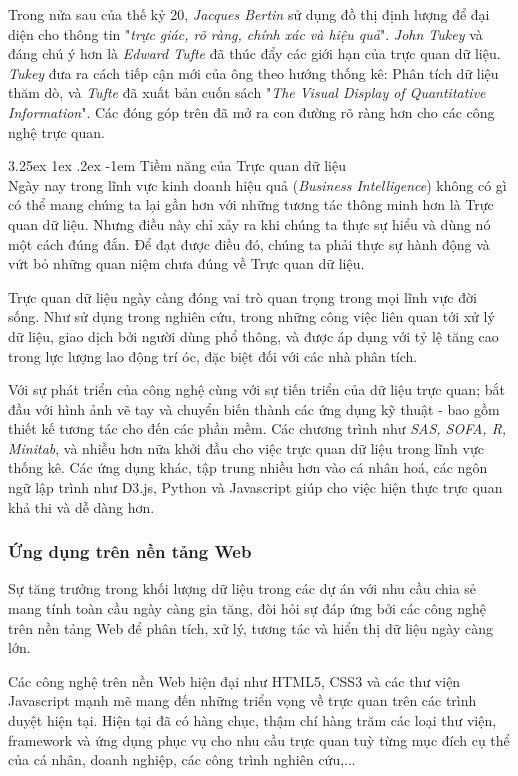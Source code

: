\documentclass[12pt,a4paper,twoside]{article}
\makeatletter
\newcommand{\myparagraph}[1]{\paragraph{#1}\mbox{}\\} %
\renewcommand\paragraph{\@startsection{paragraph}{5}{\z@}%
  {3.25ex \@plus1ex \@minus.2ex}%
  {-1em}%
  {\normalfont\normalsize\bfseries}}
\makeatother
\begin{document}
Trong nửa sau của thế kỷ 20, \textit{Jacques Bertin} sử dụng đồ thị định lượng để đại diện cho thông tin "\textit{trực giác, rõ ràng, chính xác và hiệu quả}". \cite{wiki_history_1} \textit{John Tukey} và đáng chú ý hơn là \textit{Edward Tufte} đã thúc đẩy các giới hạn của trực quan dữ liệu. \textit{Tukey} đưa ra cách tiếp cận mới của ông theo hướng thống kê: Phân tích dữ liệu thăm dò, và \textit{Tufte} đã xuất bản cuốn sách "\textit{The Visual Display of Quantitative Information}". Các đóng góp trên đã mở ra con đường rõ ràng hơn cho các công nghệ trực quan.

\myparagraph{Tiềm năng của Trực quan dữ liệu}
Ngày nay trong lĩnh vực kinh doanh hiệu quả (\textit{Business Intelligence}) không có gì có thể mang chúng ta lại gần hơn với những tương tác thông minh hơn là Trực quan dữ liệu. Nhưng điều này chỉ xảy ra khi chúng ta thực sự hiểu và dùng nó một cách đúng đắn. Để đạt được điều đó, chúng ta phải thực sự hành động và vứt bỏ những quan niệm chưa đúng về Trực quan dữ liệu.

Trực quan dữ liệu ngày càng đóng vai trò quan trọng trong mọi lĩnh vực đời sống. Như sử dụng trong nghiên cứu, trong những công việc liên quan tới xử lý dữ liệu, giao dịch bởi người dùng phổ thông, và được áp dụng với tỷ lệ tăng cao trong lực lượng lao động trí óc, đặc biệt đối với các nhà phân tích.

Với sự phát triển của công nghệ cùng với sự tiến triển của dữ liệu trực quan; bắt đầu với hình ảnh vẽ tay và chuyển biến thành các ứng dụng kỹ thuật - bao gồm thiết kế tương tác cho đến các phần mềm. \cite{wiki_history_2} Các chương trình như \textit{SAS, SOFA, R, Minitab}, và nhiều hơn nữa khởi đầu cho việc trực quan dữ liệu trong lĩnh vực thống kê. Các ứng dụng khác, tập trung nhiều hơn vào cá nhân hoá, các ngôn ngữ lập trình như D3.js, Python và Javascript giúp cho việc hiện thực trực quan khả thi và dễ dàng hơn.

\subsubsection{Ứng dụng trên nền tảng Web}
Sự tăng trưởng trong khối lượng dữ liệu trong các dự án với nhu cầu chia sẻ mang tính toàn cầu ngày càng gia tăng, đòi hỏi sự đáp ứng bởi các công nghệ trên nền tảng Web để phân tích, xử lý, tương tác và hiển thị dữ liệu ngày càng lớn. 

Các công nghệ trên nền Web hiện đại như HTML5, CSS3 và các thư viện Javascript mạnh mẽ mang đến những triển vọng về trực quan trên các trình duyệt hiện tại. Hiện tại đã có hàng chục, thậm chí hàng trăm các loại thư viện, framework và ứng dụng phục vụ cho nhu cầu trực quan tuỳ từng mục đích cụ thể của cá nhân, doanh nghiệp, các công trình nghiên cứu,...
\end{document}
